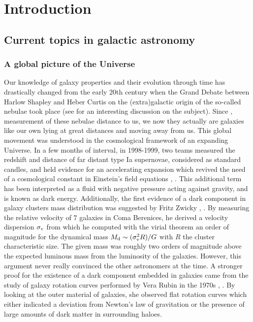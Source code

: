\clearpage
\section{Introduction}
\label{sec:Intro}

\subsection{Current topics in galactic astronomy}

\subsubsection{A global picture of the Universe}

Our knowledge of galaxy properties and their evolution through time has drastically changed from the early 20th century when the Grand Debate  between Harlow Shapley and Heber Curtis on the (extra)galactic origin of the so-called nebulae took place (see  for an interesting discussion on the subject). Since ,  measurement of these nebulae distance to us, we now they actually are galaxies like our own lying at great distances and moving away from us. This global movement was understood in the cosmological framework of an expanding Universe. In a few months of interval, in 1998-1999, two teams measured the redshift and distance of far distant type Ia supernovae, considered as standard candles, and held evidence for an accelerating expansion which revived the need of a cosmological constant in Einstein's field equations , . This additional term has been interpreted as a fluid with negative pressure acting against gravity, and is known as dark energy. Additionally, the first evidence of a dark component in galaxy clusters mass distribution was suggested by Fritz Zwicky , . By measuring the relative velocity of $7$ galaxies in Coma Berenices, he derived a velocity dispersion $\sigma_{\rm{v}}$ from which he computed with the virial theorem an order of magnitude for the dynamical mass $M_{\rm{d}} \sim (\sigma_{\rm{v}}^2 R ) / G$ with $R$ the cluster characteristic size. The given mass was roughly two orders of magnitude above the expected luminous mass from the luminosity of the galaxies. However, this argument never really convinced the other astronomers at the time. A stronger proof for the existence of a dark component embedded in galaxies came from the study of galaxy rotation curves performed by Vera Rubin in the 1970s , . By looking at the outer material of galaxies, she observed flat rotation curves which either indicated a deviation from Newton's law of gravitation or the presence of large amounts of dark matter in surrounding haloes. \\

